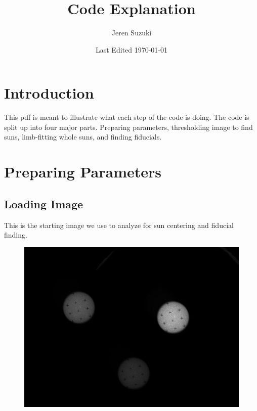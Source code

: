 \documentclass[10pt]{scrartcl}
\title{Code Explanation}
\author{Jeren Suzuki}
\date{Last Edited \today}
\begin{document}
\maketitle
{}
\tableofcontents
{}
\clearpage
{}

\section*{Introduction} %
\label{sec:introduction}
This pdf is meant to illustrate what each step of the code is doing. The code is split up into four major parts. Preparing parameters, thresholding image to find suns, limb-fitting whole suns, and finding fiducials. 

\section{Preparing Parameters} %
\label{sec:preparing_parameters}

\subsection{Loading Image} %
\label{sub:loading_image}
This is the starting image we use to analyze for sun centering and fiducial finding.
\begin{figure}[!ht]
    \centering
    \includegraphics[width=.9\textwidth]{../plots_tables_images/tritest.jpg}    
    \caption{}
    \label{flowchart}
\end{figure}

\end{document}
